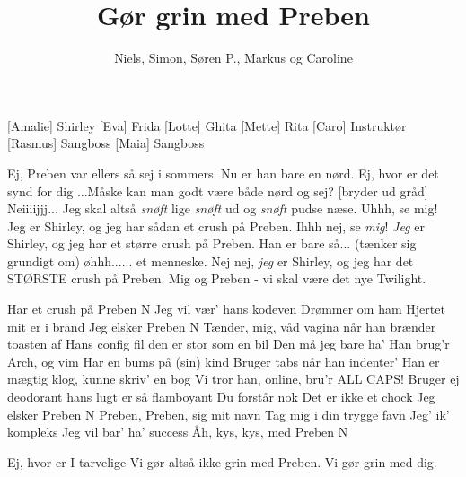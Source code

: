 \documentclass[a4paper,11pt]{article}
\title{Gør grin med Preben}
\author{Niels, Simon, Søren P., Markus og Caroline}
\begin{document}
\maketitle

\begin{roles}
  [Amalie] Shirley
  [Eva] Frida
  [Lotte] Ghita
  [Mette] Rita
  [Caro] Instruktør
  [Rasmus] Sangboss
  [Maia] Sangboss
\end{roles}

\begin{sketch}
   Ej, Preben var ellers så sej i sommers. Nu er han bare en nørd.
   Ej, hvor er det synd for dig
   ...Måske kan man godt være både nørd og sej?
  [bryder ud gråd] Neiiiijjj... Jeg skal altså \emph{snøft} lige \emph{snøft} ud og \emph{snøft} pudse næse.
   Uhhh, se mig! Jeg er Shirley, og jeg har sådan et crush på Preben.
   Ihhh nej, se \emph{mig}! \emph{Jeg} er Shirley, og jeg har et større crush på Preben. Han er bare så... (tænker sig grundigt om) øhhh...... et menneske.
   Nej nej, \emph{jeg} er Shirley, og jeg har det STØRSTE crush på Preben. Mig og Preben - vi skal være det nye Twilight.
\end{sketch}

\begin{song}
  Har et crush på Preben N
  Jeg vil vær' hans kodeven
  Drømmer om ham
  Hjertet mit er i brand
   Jeg elsker Preben N
  Tænder, mig, våd vagina
  når han brænder toasten af
  Hans config fil
  den er stor som en bil
   Den må jeg bare ha'
  Han brug'r Arch, og vim
  Har en bums på (sin) kind
  Bruger tabs når han indenter'
  Han er mægtig klog, kunne skriv' en bog
  Vi tror han, online, bru'r ALL CAPS!
  Bruger ej deodorant
  hans lugt er så flamboyant
   Du forstår nok
   Det er ikke et chock
   Jeg elsker Preben N
   Preben, Preben, sig mit navn
   Tag mig i din trygge favn
  Jeg' ik' kompleks
  Jeg vil bar' ha' success
   Åh, kys, kys, med Preben N
\end{song}


\begin{sketch}
   Ej, hvor er I tarvelige
   Vi gør altså ikke grin med Preben.
   Vi gør grin med dig.
\end{sketch}
\end{document}

